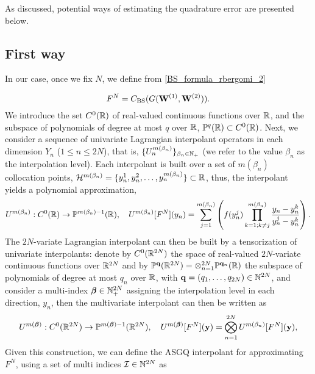 As discussed, potential ways of estimating the quadrature error are presented below.
\subsection{First way}

In our case, once we fix $N$, we define from \eqref{BS_formula_rbergomi_2}

\begin{equation*}
F^N=C_{\text{BS}}(G(\mathbf{W}^{(1)},\mathbf{W}^{(2)})) .
\end{equation*}
We introduce the set $C^0(\mathbb{R})$ of real-valued continuous functions over $\mathbb{R}$, and the subspace of polynomials of degree at most $q$ over $\mathbb{R}$, $\mathbb{P}^q(\mathbb{R}) \subset C^0(\mathbb{R})$. Next,
we consider a sequence of univariate Lagrangian interpolant operators in each dimension $Y_n$ ($1 \le n \le 2N$), that is, $\{U_n^{m(\beta_n)}\}_{\beta_n \in \mathbb{N}_+}$ (we refer to the value $\beta_n$ as the interpolation level). Each interpolant is built over a set of $m(\beta_n)$ collocation points, $\mathcal{H}^{m(\beta_n)}=\{y^1_n,y^2_n,\dots,y^{m(\beta_n)}_n\} \subset \mathbb{R}$, thus, the interpolant yields a polynomial approximation,
\begin{equation*}
U^{m(\beta_n)}:C^0(\mathbb{R}) \rightarrow \mathbb{P}^{m(\beta_n)-1}(\mathbb{R}), \quad U^{m(\beta_n)}[F^N](y_n)= \sum_{j=1}^{m(\beta_n)} \left( f(y^j_n) \prod_{k=1;k \neq j}^{m(\beta_n)} \frac{y_n-y_n^k}{y_n^j-y_n^k}\right) .
\end{equation*}
The $2N$-variate Lagrangian interpolant can then be built by a tensorization of univariate interpolants: denote by $C^0(\mathbb{R}^{2N})$ the space of real-valued $2N$-variate continuous functions over $\mathbb{R}^{2N}$ and by $\mathbb{P}^{\mathbf{q}}(\mathbb{R}^{2N}) = \otimes_{n=1}^{2N} \mathbb{P}^{\mathbf{q}_n}(\mathbb{R})$ the subspace of polynomials of degree at most $q_n$ over $\mathbb{R}$, with $\mathbf{q}=(q_1,\dots,q_{2N})\in  \mathbb{N}^{2N}$, and consider a multi-index $\boldsymbol{\beta} \in \mathbb{N}^{2N}_+$ assigning the interpolation level in each direction, $y_n$, then  the multivariate interpolant can then be written as
$$U^{m(\boldsymbol{\beta})}: C^0(\mathbb{R}^{2N}) \rightarrow \mathbb{P}^{m(\boldsymbol{\beta})-1}(\mathbb{R}^{2N}) ,\quad  U^{m(\boldsymbol{\beta})}[F^N](\mathbf{y})= \bigotimes_{n = 1}^{2N} U^{m(\beta_n)} [F^N](\mathbf{y}) , $$
Given this construction, we can define the ASGQ interpolant  for approximating $F^N$, using a set of multi indices $\mathcal{I} \in \mathbb{N}^{2N}$ as
